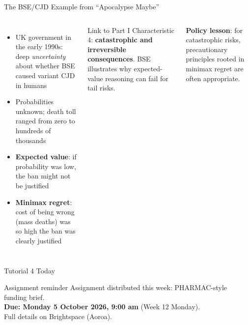 \documentclass[aspectratio=169, 12pt]{beamer}
\begin{document}
\begin{frame}{The BSE/CJD Example from ``Apocalypse Maybe''}
  \begin{columns}
      \small
      \begin{itemize}
        \item UK government in the early 1990s: deep \emph{uncertainty} about whether BSE
              caused variant CJD in humans
        \item Probabilities unknown; death toll ranged from zero to hundreds of thousands
        \item \textbf{Expected value}: if probability was low, the ban might not be justified
        \item \textbf{Minimax regret}: cost of being wrong (mass deaths) was so high the ban
              was clearly justified
      \end{itemize}
      \begin{exampleblock}{Link to Part I}
        \small Characteristic 4: \textbf{catastrophic and irreversible consequences}. BSE illustrates why expected-value reasoning can fail for tail risks.
      \end{exampleblock}
      \vspace{0.3em}
      \small \textbf{Policy lesson}: for catastrophic risks, precautionary principles rooted in minimax regret are often appropriate.
  \end{columns}
\end{frame}

\begin{frame}{Tutorial 4 Today}
  \vspace{0.5em}
  \begin{alertblock}{Assignment reminder}
    Assignment distributed this week: PHARMAC-style funding brief.\\
    \textbf{Due: Monday 5 October 2026, 9:00 am} (Week 12 Monday).\\
    Full details on Brightspace (Aoroa).
  \end{alertblock}
\end{frame}

\end{document}
